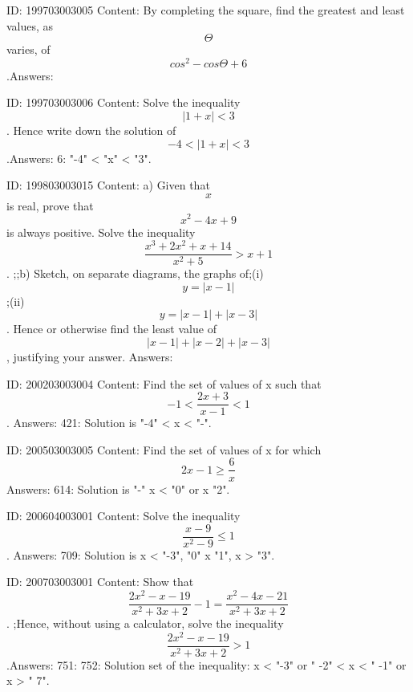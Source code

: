 \documentclass{article}
\begin{document}
ID: 199703003005
Content:
By completing the square, find the greatest and least values, as \[\Theta\] varies, of \[cos^{2} - cos\Theta + 6\].Answers:

ID: 199703003006
Content:
Solve the inequality \[|1 + x| < 3\]. Hence write down the solution of \[-4 < |1 + x| < 3\].Answers:
6: "-4" < "x" < "3".

ID: 199803003015
Content:
a)  Given that $$x$$ is real, prove that $$x^2 - 4x + 9$$  is always positive. Solve the inequality $$\frac{x^3 + 2 x^2 + x + 14}{x^2 + 5} > x + 1$$. ;;b) Sketch, on separate diagrams, the graphs of;(i) $$y = |x - 1|$$;(ii)$$y = |x - 1| + |x - 3|$$. Hence or otherwise find the least value of $$|x - 1| + |x - 2| + |x - 3|$$, justifying your answer. Answers:

ID: 200203003004
Content:
Find the set of values of x such that  $$ - 1 < \frac{2x + 3}{x - 1} < 1$$. Answers:
421:  Solution is "-4" < x < "-".

ID: 200503003005
Content:
Find the set of values of x for which $$2x - 1 \geq \frac{6}{x}$$ Answers:
614: Solution is "-" \leq x < "0" or x \geq "2".

ID: 200604003001
Content:
Solve the inequality  $$\frac{x - 9}{x^2  - 9} \le 1$$. Answers:
709: Solution is x < "-3", "0"  \leq  x  \leq "1", x > "3".

ID: 200703003001
Content:
Show that $$ \frac{2x^{2}-x-19}{x^{2}+3x+2 }-1= \frac{ x^{2}-4x-21}{x^{2}+3x+2}$$. ;Hence, without using a calculator, solve the inequality $$ \frac{2x^{2}-x-19}{x^{2}+3x+2} > 1$$.Answers:
751: 
752: Solution set of the inequality: x < "-3" or " -2" < x < " -1" or x > " 7".
\end{document}
